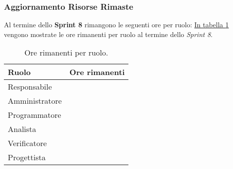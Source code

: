 \subsubsection{Aggiornamento Risorse Rimaste}
\label{sec:AggiornamentoRisorse_Sprint8}
Al termine dello \textbf{Sprint 8} rimangono le seguenti ore per ruolo: \hyperref[tab:sprint8_ore_rimanenti]{In tabella \ref{tab:sprint8_ore_rimanenti}} vengono mostrate le ore rimanenti per ruolo al termine dello \textit{Sprint 8}.

\begin{table}[H]
    \centering
    \begin{tabular}{| l | l |}
    \hline
    \textbf{Ruolo} & 
    \textbf{Ore rimanenti}\\
    \hline
        Responsabile & \\
    \hline
        Amministratore & \\
    \hline
        Programmatore & \\
    \hline
        Analista & \\
    \hline
        Verificatore & \\
    \hline
        Progettista & \\
    \hline
    \end{tabular}
    \caption{Ore rimanenti per ruolo.}
    \label{tab:sprint8_ore_rimanenti} 
\end{table}